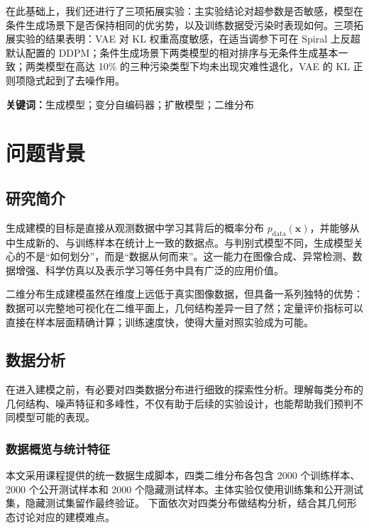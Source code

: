 \documentclass[UTF8,a4paper,12pt]{ctexart}
\begin{document}
在此基础上，我们还进行了三项拓展实验：主实验结论对超参数是否敏感，模型在条件生成场景下是否保持相同的优劣势，以及训练数据受污染时表现如何。三项拓展实验的结果表明：VAE 对 KL 权重高度敏感，在适当调参下可在 Spiral 上反超默认配置的 DDPM；条件生成场景下两类模型的相对排序与无条件生成基本一致；两类模型在高达 10\% 的三种污染类型下均未出现灾难性退化，VAE 的 KL 正则项隐式起到了去噪作用。

\vspace{1em}
\noindent\textbf{关键词：}生成模型；变分自编码器；扩散模型；二维分布

\clearpage
{}

\section{问题背景}

\subsection{研究简介}

生成建模的目标是直接从观测数据中学习其背后的概率分布 $p_{\mathrm{data}}(\mathbf{x})$，并能够从中生成新的、与训练样本在统计上一致的数据点。与判别式模型不同，生成模型关心的不是“如何划分”，而是“数据从何而来”。这一能力在图像合成、异常检测、数据增强、科学仿真以及表示学习等任务中具有广泛的应用价值。

二维分布生成建模虽然在维度上远低于真实图像数据，但具备一系列独特的优势：数据可以完整地可视化在二维平面上，几何结构差异一目了然；定量评价指标可以直接在样本层面精确计算；训练速度快，使得大量对照实验成为可能。

\subsection{数据分析}

在进入建模之前，有必要对四类数据分布进行细致的探索性分析。理解每类分布的几何结构、噪声特征和多峰性，不仅有助于后续的实验设计，也能帮助我们预判不同模型可能的表现。

\subsubsection{数据概览与统计特征}

本文采用课程提供的统一数据生成脚本，四类二维分布各包含 2000 个训练样本、2000 个公开测试样本和 2000 个隐藏测试样本。主体实验仅使用训练集和公开测试集，隐藏测试集留作最终验证。
下面依次对四类分布做结构分析，结合其几何形态讨论对应的建模难点。
\end{document}
